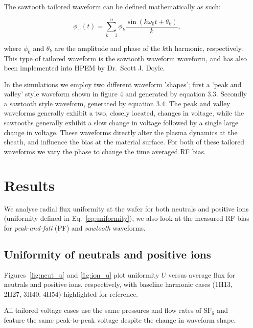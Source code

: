 \documentclass[12pt]{article}
\begin{document}
The sawtooth tailored waveform can be defined mathematically as such:

\begin{equation}
    \phi_{\text{rf}}(t) = \sum_{k=1}^{n} \phi_k \frac{ \sin(k\omega_0 t + \theta_k)}{k},
\end{equation}

where $\phi_k$ and $\theta_k$ are the amplitude and phase of the $k$th harmonic, 
respectively. This type of tailored waveform is the sawtooth waveform 
waveform, and has also been implemented into HPEM by Dr.\ Scott J. Doyle. 

In the simulations we employ two different waveform 'shapes'; first a 'peak and valley' style waveform shown in figure 4 and generated by equation 3.3. Secondly a sawtooth style waveform, generated by equation 3.4. The peak and valley waveforms generally exhibit a two, closely located, changes in voltage, while the sawtooths generally exhibit a slow change in voltage followed by a single large change in voltage. These waveforms directly alter the plasma dynamics at the sheath, and influence the bias at the material surface. For both of these tailored waveforms we vary the phase to change the time averaged RF bias. \cite{Doyle2020,Heil2008,Lafleur2012}



\section{Results}
\label{sec:results}

We analyse radial flux uniformity at the wafer for both neutrals and positive ions (uniformity defined in Eq.~\ref{eq:uniformity}), we also look at the measured RF bias for \emph{peak-and-fall} (PF) and \emph{sawtooth} waveforms.

\subsection{Uniformity of neutrals and positive ions}
Figures~\ref{fig:neut_u} and \ref{fig:ion_u} plot uniformity $U$ versus average flux for neutrals and positive ions, respectively, with baseline harmonic cases (1H13, 2H27, 3H40, 4H54) highlighted for reference.

All tailored voltage cases use the same pressures and flow rates of $\text{SF}_6$ and feature the same peak-to-peak voltage despite the change in waveform shape.
\end{document}
